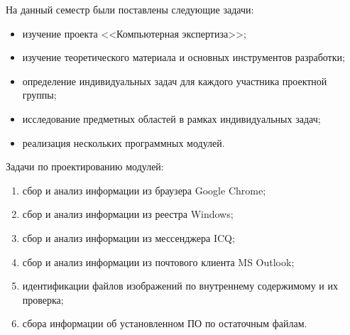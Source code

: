 На данный семестр были поставлены следующие задачи:

\begin{itemize}
\item изучение проекта <<Компьютерная экспертиза>>;
\item изучение теоретического материала и основных инструментов разработки;
\item определение индивидуальных задач для каждого участника проектной группы;
\item исследование предметных областей в рамках индивидуальных задач; 
\item реализация нескольких программных модулей.
\end{itemize}

Задачи по проектированию модулей:

\begin{enumerate}
\item сбор и анализ информации из браузера Google Chrome;
\item сбор и анализ информации из реестра Windows;
\item сбор и анализ информации из мессенджера ICQ;
\item сбор и анализ информации из почтового клиента MS Outlook;
\item идентификации файлов изображений по внутреннему содержимому и их проверка;
\item сбора информации об установленном ПО по остаточным файлам.
\end{enumerate}
